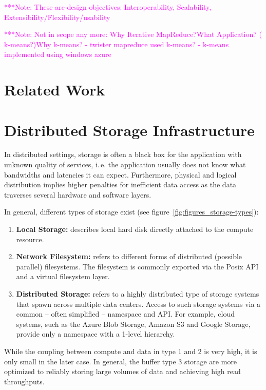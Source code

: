 \documentclass[times]{cpeauth}
\newcommand{\note}[1]{ {\textcolor{magenta} { ***Note: #1 }}}
\newcommand{\note}[1]{}
\begin{document}
\note{These are design objectives: Interoperability, Scalability,
  Extensibility/Flexibility/usability}

\note{Not in scope any more: Why Iterative MapReduce?What
  Application?  ( k-means?)Why k-means?  - twister mapreduce used
  k-means?  - k-means implemented using windows azure}


\section{Related Work}


\section{Distributed Storage Infrastructure}

In distributed settings, storage is often a black box for the application with
unknown quality of services, i.\,e. the application usually does not know what
bandwidths and latencies it can expect. Furthermore, physical and logical
distribution implies higher penalties for inefficient data access as the data
traverses several hardware and software layers.

In general, different types of storage exist (see 
figure~\ref{fig:figures_storage-types}):

\begin{enumerate}
	\item \textbf{Local Storage:} describes local hard disk directly attached 
	to the compute resource.
	\item \textbf{Network Filesystem:} refers to different forms of 
	distributed (possible parallel) filesystems. The filesystem is commonly 
	exported via the Posix API and a virtual filesystem layer.
	\item \textbf{Distributed Storage:} refers to a highly distributed type of 
	storage systems that spawn across multiple data centers. Access to such 
	storage systems via a common -- often simplified -- namespace and API. For 
	example, cloud systems, such as the Azure Blob Storage, Amazon S3 and 
	Google Storage, provide only a namespace with a 1-level hierarchy. 
\end{enumerate}

While the coupling between compute and data in type 1 and 2 is very high, it 
is only small in the later case. In general, the buffer type 3 storage are 
more optimized to reliably storing large volumes of data and achieving high
read throughputs.
\end{document}
